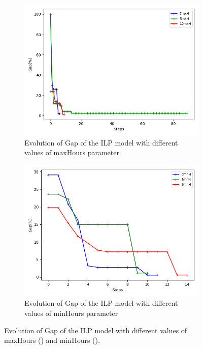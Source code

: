 \begin{figure}[h!]
\begin{subfigure}[b]{.49\linewidth}
\centering
\includegraphics[width=\linewidth]{./img/instances_maxhours_ilp_evol.png}
\caption{Evolution of Gap of the ILP model with different values of maxHours parameter }\label{fig1c}
\end{subfigure}
\begin{subfigure}[b]{.49\linewidth}
\centering
\includegraphics[width=\linewidth]{./img/instances_minhours_ilp_evol.png}
\caption{Evolution of Gap of the ILP model with different values of minHours parameter }\label{fig1d}
\end{subfigure}
\caption{Evolution of Gap of the ILP model with different values of maxHours () and minHours ().  }
\label{fig_ilp_size3}
\end{figure}


